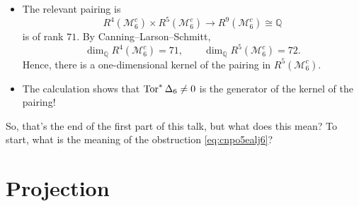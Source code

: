 \documentclass[reqno]{amsart} 
\begin{document}
\begin{itemize}
\item The relevant pairing is
  \begin{equation*}
    R^4(\mathcal{M}_6^c) \times R^5(\mathcal{M}_6^c) \rightarrow R^9(\mathcal{M}_6^c) \cong \mathbb{Q}
  \end{equation*}
  is of rank $71$.  By Canning--Larson--Schmitt,
  \begin{equation*}
    \dim_{\mathbb{Q}} R^4(\mathcal{M}_6^c) = 71, \qquad
    \dim_{\mathbb{Q}} R^5(\mathcal{M}_6^c) = 72.
  \end{equation*}
  Hence, there is a one-dimensional kernel of the pairing in $R^5(\mathcal{M}_6^c)$.
\item The calculation shows that $\operatorname{Tor}^\ast \Delta_6 \neq 0$ is the generator of the kernel of the pairing!
\end{itemize}

So, that's the end of the first part of this talk, but what does this mean?  To start, what is the meaning of the obstruction \eqref{eq:cnpo5ealj6}?

\section{Projection}
\end{document}
